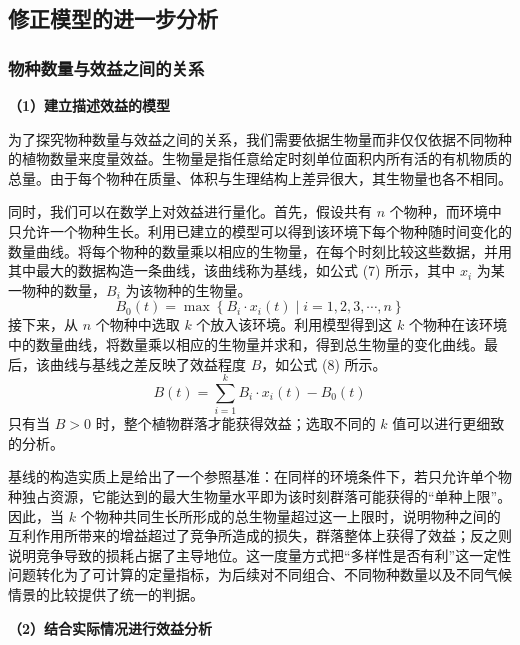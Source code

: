 \documentclass[11pt,a4paper]{ctexart}
\begin{document}
\subsection{修正模型的进一步分析}

\subsubsection{物种数量与效益之间的关系}

\textbf{（1）建立描述效益的模型}

为了探究物种数量与效益之间的关系，我们需要依据生物量而非仅仅依据不同物种的植物数量来度量效益。生物量是指任意给定时刻单位面积内所有活的有机物质的总量。由于每个物种在质量、体积与生理结构上差异很大，其生物量也各不相同。

同时，我们可以在数学上对效益进行量化。首先，假设共有 $n$ 个物种，而环境中只允许一个物种生长。利用已建立的模型可以得到该环境下每个物种随时间变化的数量曲线。将每个物种的数量乘以相应的生物量，在每个时刻比较这些数据，并用其中最大的数据构造一条曲线，该曲线称为基线，如公式 (7) 所示，其中 $x_i$ 为某一物种的数量，$B_i$ 为该物种的生物量。
\begin{equation}
B_0(t)=\max\left\{B_i\cdot x_i(t)\mid i=1,2,3,\cdots,n\right\}
\end{equation}
接下来，从 $n$ 个物种中选取 $k$ 个放入该环境。利用模型得到这 $k$ 个物种在该环境中的数量曲线，将数量乘以相应的生物量并求和，得到总生物量的变化曲线。最后，该曲线与基线之差反映了效益程度 $B$，如公式 (8) 所示。
\begin{equation}
B(t)=\sum_{i=1}^{k}B_i\cdot x_i(t)-B_0(t)
\end{equation}
只有当 $B>0$ 时，整个植物群落才能获得效益；选取不同的 $k$ 值可以进行更细致的分析。

基线的构造实质上是给出了一个参照基准：在同样的环境条件下，若只允许单个物种独占资源，它能达到的最大生物量水平即为该时刻群落可能获得的“单种上限”。因此，当 $k$ 个物种共同生长所形成的总生物量超过这一上限时，说明物种之间的互利作用所带来的增益超过了竞争所造成的损失，群落整体上获得了效益；反之则说明竞争导致的损耗占据了主导地位。这一度量方式把“多样性是否有利”这一定性问题转化为了可计算的定量指标，为后续对不同组合、不同物种数量以及不同气候情景的比较提供了统一的判据。

\textbf{（2）结合实际情况进行效益分析}
\end{document}
